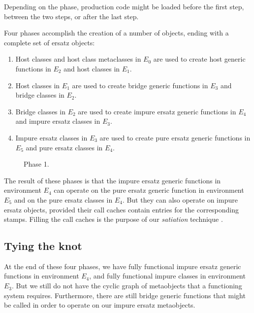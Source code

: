 Depending on the phase, \sicl{} production code might be loaded before
the first step, between the two steps, or after the last step.

Four phases accomplish the creation of a number of objects, ending
with a complete set of ersatz objects:

\begin{enumerate}
\item Host classes and host class metaclasses in $E_0$
  are used to create host generic functions in $E_2$ and host classes
  in $E_1$.
\item Host classes in $E_1$ are used to create bridge
  generic functions in $E_3$ and bridge classes in $E_2$.
\item Bridge classes in $E_2$ are used to create impure
  ersatz generic functions in $E_4$ and impure ersatz classes in
  $E_3$.
\item Impure ersatz classes in $E_3$ are used to create
  pure ersatz generic functions in $E_5$ and pure ersatz classes in
  $E_4$.
\end{enumerate}

\begin{figure}
\begin{center}
\end{center}
\caption{\label{fig-phase-1}
Phase 1.}
\end{figure}

The result of these phases is that the impure ersatz generic functions
in environment $E_4$ can operate on the pure ersatz generic function
in environment $E_5$ and on the pure ersatz classes in $E_4$.  But
they can also operate on impure ersatz objects, provided their call
caches contain entries for the corresponding stamps.  Filling the call
caches is the purpose of our \emph{satiation} technique
\cite{Strandh:2014:RMI:2635648.2635656}.

\subsection{Tying the knot}

At the end of these four phases, we have fully functional impure ersatz
generic functions in environment $E_4$, and fully functional impure
classes in environment $E_3$.  But we still do not have the cyclic graph
of metaobjects that a functioning \clos{} system requires.
Furthermore, there are still bridge generic functions
that might be called in order to operate on our impure ersatz
metaobjects.

